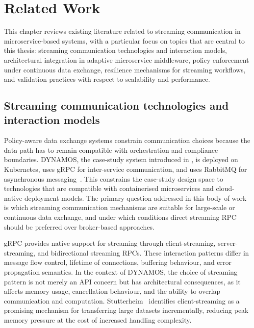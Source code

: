 \chapter{Related Work}\label{ch:related}

This chapter reviews existing literature related to streaming communication in microservice-based systems, with a particular focus on topics that are central to this thesis: streaming communication technologies and interaction models, architectural integration in adaptive microservice middleware, policy enforcement under continuous data exchange, resilience mechanisms for streaming workflows, and validation practices with respect to scalability and performance.

\section{Streaming communication technologies and interaction models}

Policy-aware data exchange systems constrain communication choices because the data path has to remain compatible with orchestration and compliance boundaries. DYNAMOS, the case-study system introduced in , is deployed on Kubernetes, uses gRPC for inter-service communication, and uses RabbitMQ for asynchronous messaging~\cite{stutterheim2023thesis,stutterheim2023icsa}. This constrains the case-study design space to technologies that are compatible with containerised microservices and cloud-native deployment models. The primary question addressed in this body of work is which streaming communication mechanisms are suitable for large-scale or continuous data exchange, and under which conditions direct streaming RPC should be preferred over broker-based approaches.

gRPC provides native support for streaming through client-streaming, server-streaming, and bidirectional streaming RPCs. These interaction patterns differ in message flow control, lifetime of connections, buffering behaviour, and error propagation semantics. In the context of DYNAMOS, the choice of streaming pattern is not merely an API concern but has architectural consequences, as it affects memory usage, cancellation behaviour, and the ability to overlap communication and computation. Stutterheim~\cite{stutterheim2023thesis} identifies client-streaming as a promising mechanism for transferring large datasets incrementally, reducing peak memory pressure at the cost of increased handling complexity.

